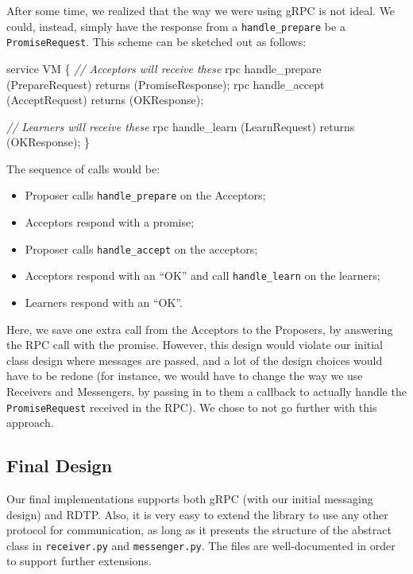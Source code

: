 \documentclass[12pt,]{article}
\newenvironment{Shaded}{\begin{snugshade}}{\end{snugshade}}
\newcommand{\CommentTok}[1]{\textcolor[rgb]{0.56,0.35,0.01}{\textit{{#1}}}}
\newcommand{\NormalTok}[1]{{#1}}
\providecommand{\tightlist}{%
  \setlength{\itemsep}{0pt}\setlength{\parskip}{0pt}}
\begin{document}
After some time, we realized that the way we were using gRPC is not
ideal. We could, instead, simply have the response from a
\texttt{handle\_prepare} be a \texttt{PromiseRequest}. This scheme can
be sketched out as follows:

\begin{Shaded}
\begin{Highlighting}[]
\NormalTok{service VM \{}
    \CommentTok{// Acceptors will receive these}
    \NormalTok{rpc handle_prepare (PrepareRequest) returns (PromiseResponse);}
    \NormalTok{rpc handle_accept (AcceptRequest) returns (OKResponse);}

    \CommentTok{// Learners will receive these}
    \NormalTok{rpc handle_learn (LearnRequest) returns (OKResponse);}
\NormalTok{\}}
\end{Highlighting}
\end{Shaded}

The sequence of calls would be:

\begin{itemize}
\tightlist
\item
  Proposer calls \texttt{handle\_prepare} on the Acceptors;
\item
  Acceptors respond with a promise;
\item
  Proposer calls \texttt{handle\_accept} on the acceptors;
\item
  Acceptors respond with an ``OK'' and call \texttt{handle\_learn} on
  the learners;
\item
  Learners respond with an ``OK''.
\end{itemize}

Here, we save one extra call from the Acceptors to the Proposers, by
answering the RPC call with the promise. However, this design would
violate our initial class design where messages are passed, and a lot of
the design choices would have to be redone (for instance, we would have
to change the way we use Receivers and Messengers, by passing in to them
a callback to actually handle the \texttt{PromiseRequest} received in
the RPC). We chose to not go further with this approach.

\subsection{Final Design}\label{final-design}

Our final implementations supports both gRPC (with our initial messaging
design) and RDTP. Also, it is very easy to extend the library to use any
other protocol for communication, as long as it presents the structure
of the abstract class in \texttt{receiver.py} and \texttt{messenger.py}.
The files are well-documented in order to support further extensions.
\end{document}
